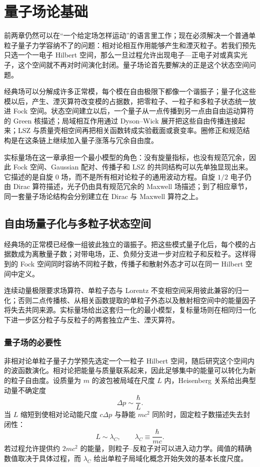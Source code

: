 \chapter{量子场论基础}\label{chap:qft-foundations}

前两章仍然可以在“一个给定场怎样运动”的语言里工作；现在必须解决一个普通单粒子量子力学容纳不了的问题：相对论相互作用能够产生和湮灭粒子。若我们预先只选一个一电子 Hilbert 空间，那么一旦过程允许出现电子—正电子对或真实光子，这个空间就不再对时间演化封闭。量子场论首先要解决的正是这个状态空间问题。

经典场可以分解成许多正常模，每个模在自由极限下都像一个谐振子；量子化这些模以后，产生、湮灭算符改变模的占据数，把零粒子、一粒子和多粒子状态统一放进 Fock 空间。状态空间建立以后，一个量子从一点传播到另一点由自由运动算符的 Green 核描述；局域相互作用通过 Dyson--Wick 展开把这些自由传播连接起来；LSZ 与质量壳相空间再把相关函数转成实验截面或衰变率。圈修正和规范结构是在这条链上继续加入量子涨落与冗余自由度。

实标量场在这一章承担一个最小模型的角色：没有旋量指标，也没有规范冗余，因此 Fock 空间、Gaussian 配对、传播子和 LSZ 的共同结构可以先单独显现出来。它描述的是自旋 $0$ 场，而不是所有相对论粒子的通用波动方程。自旋 $1/2$ 电子仍由 Dirac 算符描述，光子仍由具有规范冗余的 Maxwell 场描述；到了相应章节，同一套量子场论结构会分别建立在 Dirac 与 Maxwell 算符之上。

\section{自由场量子化与多粒子状态空间}

经典场的正常模已经像一组彼此独立的谐振子。把这些模式量子化后，每个模的占据数成为离散量子数；对带电场，正、负频分支进一步对应粒子和反粒子。这样得到的 Fock 空间同时容纳不同粒子数，传播子和散射外态才可以在同一 Hilbert 空间中定义。

连续动量极限要求场算符、单粒子态与 Lorentz 不变相空间采用彼此兼容的归一化；否则二点传播核、从相关函数提取的单粒子外态以及散射相空间中的能量因子将失去共同来源。实标量场给出这套归一化的最小模型，复标量场则在相同归一化下进一步区分粒子与反粒子的两套独立产生、湮灭算符。

\subsection{量子场的必要性}

非相对论单粒子量子力学预先选定一个一粒子 Hilbert 空间，随后研究这个空间内的波函数演化。相对论把能量与质量联系起来，因此足够集中的能量可以转化为新的粒子自由度。设质量为 $m$ 的波包被局域在尺度 $L$ 内，Heisenberg 关系给出典型动量不确定度
\begin{equation*}
 \Delta p\sim \frac{\hbar}{L}.
\end{equation*}
当 $L$ 缩短到使相对论动能尺度 $c\Delta p$ 与静能 $mc^2$ 同阶时，固定粒子数描述失去封闭性：
\begin{equation}
 L\sim \lambda_C,
 \qquad
 \lambda_C\equiv\frac{\hbar}{mc}.
 \label{eq:qft-compton-scale}
\end{equation}
若过程允许提供约 $2mc^2$ 的能量，则粒子--反粒子对可以进入动力学。阈值的精确数值取决于具体过程，而 $\lambda_C$ 给出单粒子局域化概念开始失效的基本长度尺度。

